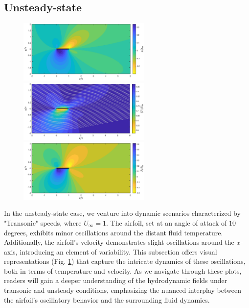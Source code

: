 \subsection{Unsteady-state}
\begin{figure}
\caption{}
    \includegraphics[width=0.58\textwidth]{drawings/U1_alpha10_density.eps}
    \vspace{0.07cm}
    \includegraphics[width=0.58\textwidth]{drawings/U1_alpha10_velocity.eps}
    \vspace{0.07cm}
    \includegraphics[width=0.58\textwidth]{drawings/U1_alpha10_pressure.eps}
    \vspace{0.07cm}
    \begin{minipage}{0.58\textwidth}
    \end{minipage}
    \label{fig:unsteady_state}
\end{figure}
In the unsteady-state case, we venture into dynamic scenarios characterized by "Transonic" speeds, where $U_\infty = 1$. The airfoil, set at an angle of attack of $10$ degrees, exhibits minor oscillations around the distant fluid temperature. Additionally, the airfoil's velocity demonstrates slight oscillations around the $x$-axis, introducing an element of variability. This subsection offers visual representations (Fig. \ref{fig:unsteady_state}) that capture the intricate dynamics of these oscillations, both in terms of temperature and velocity. As we navigate through these plots, readers will gain a deeper understanding of the hydrodynamic fields under transonic and unsteady conditions, emphasizing the nuanced interplay between the airfoil's oscillatory behavior and the surrounding fluid dynamics.

